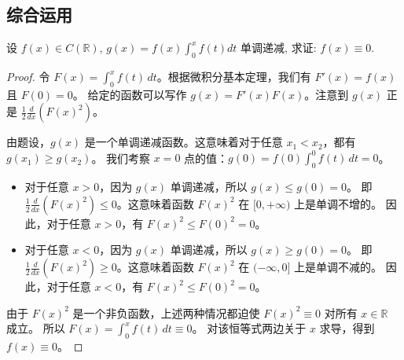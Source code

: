 \documentclass[lang=cn,10pt,thmcnt=section]{elegantbook}
\begin{document}
\subsection{综合运用}
\begin{example}
    设 \( f(x) \in C(\mathbb{R}) \), \( g(x) = f(x)\int_{0}^{x} f(t) dt \) 单调递减, 求证: \( f(x) \equiv 0 \).
\end{example}
\begin{proof}
    令 $F(x) = \int_0^x f(t) \, dt$。根据微积分基本定理，我们有 $F'(x) = f(x)$ 且 $F(0)=0$。
    给定的函数可以写作 $g(x) = F'(x)F(x)$。注意到 $g(x)$ 正是 $\frac{1}{2}\frac{d}{dx} \left( F(x)^2 \right)$。
    
    由题设，$g(x)$ 是一个单调递减函数。这意味着对于任意 $x_1 < x_2$，都有 $g(x_1) \ge g(x_2)$。
    我们考察 $x=0$ 点的值：$g(0) = f(0) \int_0^0 f(t) \, dt = 0$。
    
    \begin{itemize}
        \item 对于任意 $x > 0$，因为 $g(x)$ 单调递减，所以 $g(x) \le g(0) = 0$。
        即 $\frac{1}{2}\frac{d}{dx} \left( F(x)^2 \right) \le 0$。这意味着函数 $F(x)^2$ 在 $[0, +\infty)$ 上是单调不增的。
        因此，对于任意 $x > 0$，有 $F(x)^2 \le F(0)^2 = 0$。
        
        \item 对于任意 $x < 0$，因为 $g(x)$ 单调递减，所以 $g(x) \ge g(0) = 0$。
        即 $\frac{1}{2}\frac{d}{dx} \left( F(x)^2 \right) \ge 0$。这意味着函数 $F(x)^2$ 在 $(-\infty, 0]$ 上是单调不减的。
        因此，对于任意 $x < 0$，有 $F(x)^2 \le F(0)^2 = 0$。
    \end{itemize}
    
    由于 $F(x)^2$ 是一个非负函数，上述两种情况都迫使 $F(x)^2 \equiv 0$ 对所有 $x \in \mathbb{R}$ 成立。
    所以 $F(x) = \int_0^x f(t) \, dt \equiv 0$。
    对该恒等式两边关于 $x$ 求导，得到 $f(x) \equiv 0$。
\end{proof}
\end{document}
